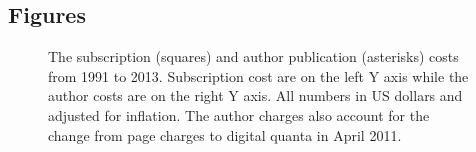 \documentclass[preprint2]{aastex63}
\newcommand\aastex{AAS\TeX}
\begin{document}

\subsection{Figures\label{subsec:figures}}

\begin{figure}[ht!]
\caption{The subscription (squares) and author publication (asterisks) 
costs from 1991 to 2013. Subscription cost are on the left Y axis while
the author costs are on the right Y axis. All numbers in US dollars and
adjusted for inflation. The author charges also account for the change
from page charges to digital quanta in April 2011.  \label{fig:general}}
\end{figure}
\end{document}
